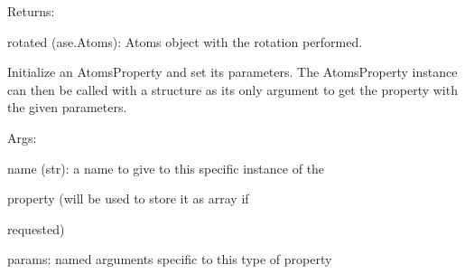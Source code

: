 \documentclass[letterpaper,10pt,english]{sphinxmanual}
\begin{document}
\begin{fulllineitems}
\begin{DUlineblock}{0em}
\item[] Returns:
\item[]
\begin{DUlineblock}{\DUlineblockindent}
\item[] rotated (ase.Atoms): Atoms object with the rotation performed.
\end{DUlineblock}
\end{DUlineblock}

Initialize an AtomsProperty and set its parameters.
The AtomsProperty instance can then be called with a structure as its
only argument to get the property with the given parameters.

\begin{DUlineblock}{0em}
\item[] Args:
\item[]
\begin{DUlineblock}{\DUlineblockindent}
\item[] name (str): a name to give to this specific instance of the
\item[]
\begin{DUlineblock}{\DUlineblockindent}
\item[] property (will be used to store it as array if
\item[] requested)
\end{DUlineblock}
\item[] params: named arguments specific to this type of property
\end{DUlineblock}
\end{DUlineblock}

\begin{fulllineitems}
\label{doctree/soprano.properties.transform.transform:soprano.properties.transform.transform.Rotate.default_name}
\end{fulllineitems}


\begin{fulllineitems}
\label{doctree/soprano.properties.transform.transform:soprano.properties.transform.transform.Rotate.default_params}
\end{fulllineitems}


\begin{fulllineitems}
\label{doctree/soprano.properties.transform.transform:soprano.properties.transform.transform.Rotate.extract}
\end{fulllineitems}


\end{fulllineitems}
\end{document}
